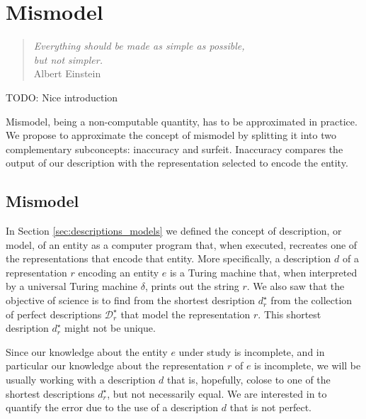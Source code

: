 %
%


\chapter{Mismodel}
\label{chap:Redundancy}

\begin{quote}
\begin{flushright}
\emph{Everything should be made as simple as possible,\\
but not simpler.}\\
Albert Einstein 
\end{flushright}
\end{quote}
\bigskip

{\color{red} TODO: Nice introduction}

Mismodel, being a non-computable quantity, has to be approximated in practice. We propose to approximate the concept of mismodel by splitting it into two complementary subconcepts: inaccuracy and surfeit. Inaccuracy compares the output of our description with the representation selected to encode the entity.

%
%

\section{Mismodel}

In Section \ref{sec:descriptions_models} we defined the concept of description, or model, of an entity as a computer program that, when executed, recreates one of the representations that encode that entity. More specifically, a description $d$ of a representation $r$ encoding an entity $e$ is a Turing machine that, when interpreted by a universal Turing machine $\delta$, prints out the string $r$. We also saw that the objective of science is to find from the shortest desription $d^\star_r$ from the collection of perfect descriptions $\mathcal{D}^\star_r$ that model the representation $r$. This shortest desription $d^\star_r$ might not be unique.

Since our knowledge about the entity $e$ under study is incomplete, and in particular our knowledge about the representation $r$ of $e$ is incomplete, we will be usually working with a description $d$ that is, hopefully, colose to one of the shortest descriptions $d^\star_r$, but not necessarily equal. We are interested in to quantify the error due to the use of a description $d$ that is not perfect.

